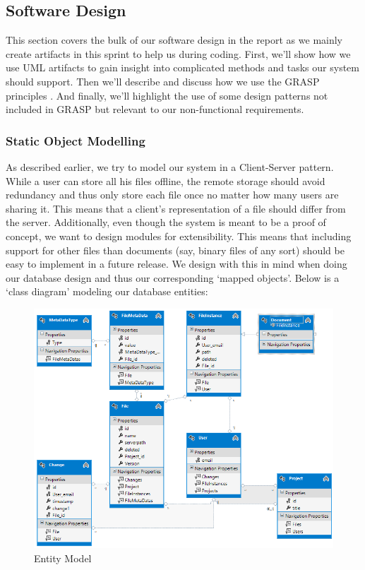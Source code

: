 \subsection{Software Design}
This section covers the bulk of our software design in the report as we mainly create artifacts in this sprint to help us during coding. First, we’ll show how we use UML artifacts to gain insight into complicated methods and tasks our system should support. Then we’ll describe and discuss how we use the GRASP principles \cite[p.~271, p.~413]{OOAD}. And finally, we’ll highlight the use of some design patterns not included in GRASP but relevant to our non-functional requirements.
\subsubsection{Static Object Modelling}
As described earlier, we try to model our system in a Client-Server pattern. While a user can store all his files offline, the remote storage should avoid redundancy and thus only store each file once no matter how many users are sharing it. This means that a client’s representation of a file should differ from the server. Additionally, even though the system is meant to be a proof of concept, we want to design modules for extensibility. This means that including support for other files than documents (say, binary files of any sort) should be easy to implement in a future release. We design with this in mind when doing our database design and thus our corresponding ‘mapped objects’. Below is a ‘class diagram’ modeling our database entities:\\
\begin{figure}[h]
  \includegraphics[width=\textwidth,natwidth=793,natheight=635]{illustrations/entitymodel.png}
  \caption{Entity Model}
  \label{entitymodel2}
\end{figure}
